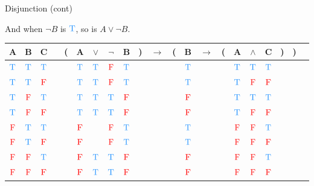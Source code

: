 \documentclass[
  ignorenonframetext,
]{beamer}
\renewcommand{\,}{\text{, }}
\def\True{\textcolor{dodgerblue}{\text{T}}}
\def\False{\textcolor{red}{\text{F}}}
\begin{document}
\begin{frame}{Disjunction (cont)}
\protect\hypertarget{disjunction-cont}{}

And when \(\neg B\) is \(\True\), so is \(A \vee \neg B\).

\begin{center}
\bigskip
\begin{tabular}{@{ }c@{ }@{ }c@{ }@{ }c | c@{ }@{}c@{}@{ }c@{ }@{ }c@{ }@{ }c@{ }@{ }c@{ }@{}c@{}@{ }c@{ }@{}c@{}@{ }c@{ }@{ }c@{ }@{}c@{}@{ }c@{ }@{ }c@{ }@{ }c@{ }@{}c@{}@{}c@{}@{ }c}
A & B & C &  & ( & A & $\vee$ & $\neg$ & B & ) & $\rightarrow$ & ( & B & $\rightarrow$ & ( & A & $\wedge$ & C & ) & ) & \\
\hline 
 $\True$ & $\True$ & $\True$ &  &  & $\True$ & $\True$ & $\False$ & $\True$ &  &&  & $\True$ &&  & $\True$ & $\True$ & $\True$ &  &  & \\
 $\True$ & $\True$ & $\False$ &  &  & $\True$ & $\True$ & $\False$ & $\True$ &  &&  & $\True$ &&  & $\True$ & $\False$ & $\False$ &  &  & \\
 $\True$ & $\False$ & $\True$ &  &  & $\True$ & $\True$ & $\True$ & $\False$ &  &&  & $\False$ &&  & $\True$ & $\True$ & $\True$ &  &  & \\
 $\True$ & $\False$ & $\False$ &  &  & $\True$ & $\True$ & $\True$ & $\False$ &  &&  & $\False$ &&  & $\True$ & $\False$ & $\False$ &  &  & \\
 $\False$ & $\True$ & $\True$ &  &  & $\False$ && $\False$ & $\True$ &  &&  & $\True$ &&  & $\False$ & $\False$ & $\True$ &  &  & \\
 $\False$ & $\True$ & $\False$ &  &  & $\False$ && $\False$ & $\True$ &  &&  & $\True$ &&  & $\False$ & $\False$ & $\False$ &  &  & \\
 $\False$ & $\False$ & $\True$ &  &  & $\False$ & $\True$ & $\True$ & $\False$ &  &&  & $\False$ &&  & $\False$ & $\False$ & $\True$ &  &  & \\
 $\False$ & $\False$ & $\False$ &  &  & $\False$ & $\True$ & $\True$ & $\False$ &  &&  & $\False$ &&  & $\False$ & $\False$ & $\False$ &  &  & \\
\end{tabular}
\bigskip
\end{center}

\end{frame}
\end{document}
